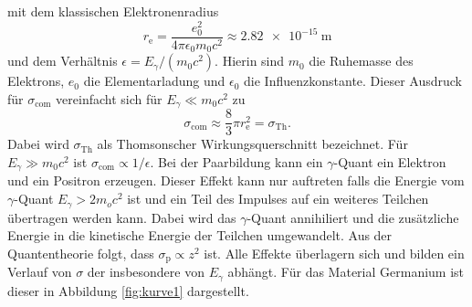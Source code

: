 mit dem klassischen Elektronenradius
\begin{equation}
	r_\text{e} = \frac{e_0^2}{4 \pi \epsilon_0 m_0 c^2} \approx \SI{2.82e-15}{\meter}
\end{equation}
und dem Verhältnis $\epsilon = E_\gamma / (m_0 c^2)$.
Hierin sind $m_0$ die Ruhemasse des Elektrons, $e_0$ die Elementarladung und $\epsilon_0$ die Influenzkonstante. Dieser Ausdruck für $\sigma_\text{com}$ vereinfacht sich für $E_\gamma \ll m_0 c^2$ zu
\begin{equation}
	\sigma_\text{com} \approx \frac{8}{3} \pi r_\text{e}^2 = \sigma_\text{Th} \text{.}
\end{equation}
Dabei wird $\sigma_\text{Th}$ als Thomsonscher Wirkungsquerschnitt bezeichnet.
Für $E_\gamma \gg m_0 c^2$ ist $\sigma_\text{com} \propto 1/\epsilon$. 
Bei der Paarbildung kann ein $\gamma$-Quant ein Elektron und ein Positron erzeugen. Dieser Effekt kann nur auftreten falls die Energie vom $\gamma$-Quant $E_\gamma > 2 m_o c^2$ ist und ein Teil des Impulses auf ein weiteres Teilchen übertragen werden kann. Dabei wird das $\gamma$-Quant annihiliert und die zusätzliche Energie in die kinetische Energie der Teilchen umgewandelt. Aus der Quantentheorie folgt, dass $\sigma_\text{p} \propto z^2$ ist.
Alle Effekte überlagern sich und bilden ein Verlauf von $\sigma$ der insbesondere von $E_\gamma$ abhängt. Für das Material Germanium ist dieser in Abbildung \ref{fig:kurve1} dargestellt.
